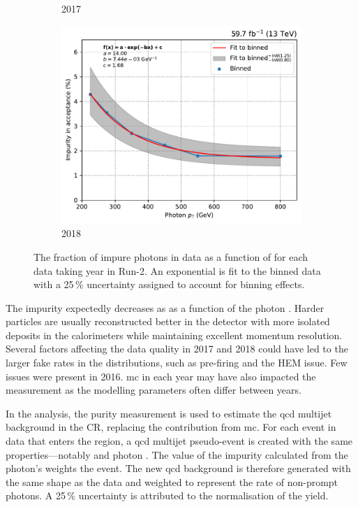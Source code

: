 \begin{figure}[htbp]
\begin{subfigure}[b]{0.32\textwidth}
        \caption{2017}
    \end{subfigure}
    \hfill
    \begin{subfigure}[b]{0.32\textwidth}
        \includegraphics[width=\textwidth]{figures/photon_purity/2018/impurity_plot_2018.pdf}
        \caption{2018}
    \end{subfigure}
    \caption[The fraction of impure photons in data as a function of \pt for each data taking year in Run-2]{The fraction of impure photons in data as a function of \pt for each data taking year in Run-2. An exponential is fit to the binned data with a 25\,\% uncertainty assigned to account for binning effects.}
    \label{fig:htoinv_photon_impurity}
\end{figure}

The impurity expectedly decreases as as a function of the photon \pt. Harder particles are usually reconstructed better in the detector with more isolated deposits in the calorimeters while maintaining excellent momentum resolution. Several factors affecting the data quality in 2017 and 2018 could have led to the larger fake rates in the distributions, such as pre-firing and the HEM issue. Few issues were present in 2016. \acrlong{mc} in each year may have also impacted the measurement as the modelling parameters often differ between years.

In the analysis, the purity measurement is used to estimate the \acrshort{qcd} multijet background in the \singlePhotonCr \gls{CR}, replacing the contribution from \acrshort{mc}. For each event in data that enters the region, a \acrshort{qcd} multijet pseudo-event is created with the same properties---notably \ptmiss and photon \pt. The value of the impurity calculated from the photon's \pt weights the event. The new \acrshort{qcd} background is therefore generated with the same shape as the data and weighted to represent the rate of non-prompt photons. A 25\,\% uncertainty is attributed to the normalisation of the yield.


